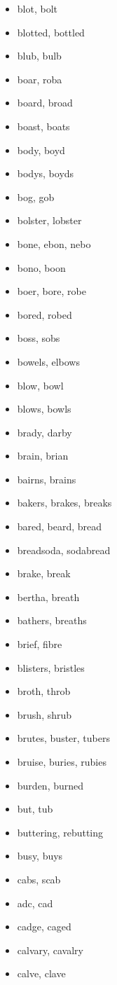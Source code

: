 \documentclass[a4wide,11pt]{report}
\begin{document}
\begin{itemize}
  \item blot, bolt
  \item blotted, bottled
  \item blub, bulb
  \item boar, roba
  \item board, broad
  \item boast, boats
  \item body, boyd
  \item bodys, boyds
  \item bog, gob
  \item bolster, lobster
  \item bone, ebon, nebo
  \item bono, boon
  \item boer, bore, robe
  \item bored, robed
  \item boss, sobs
  \item bowels, elbows
  \item blow, bowl
  \item blows, bowls
  \item brady, darby
  \item brain, brian
  \item bairns, brains
  \item bakers, brakes, breaks
  \item bared, beard, bread
  \item breadsoda, sodabread
  \item brake, break
  \item bertha, breath
  \item bathers, breaths
  \item brief, fibre
  \item blisters, bristles
  \item broth, throb
  \item brush, shrub
  \item brutes, buster, tubers
  \item bruise, buries, rubies
  \item burden, burned
  \item but, tub
  \item buttering, rebutting
  \item busy, buys
  \item cabs, scab
  \item adc, cad
  \item cadge, caged
  \item calvary, cavalry
  \item calve, clave

\end{itemize}
\end{document}
